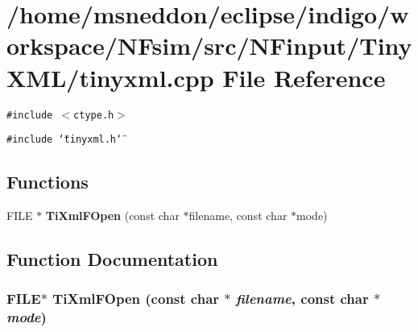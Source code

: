 \section{/home/msneddon/eclipse/indigo/workspace/NFsim/src/NFinput/TinyXML/tinyxml.cpp File Reference}
\label{tinyxml_8cpp}


{\tt \#include $<$ctype.h$>$}\par
{\tt \#include \char`\"{}tinyxml.h\char`\"{}}\par
\subsection*{Functions}
\begin{CompactItemize}
\item 
FILE $\ast$ {\bf TiXmlFOpen} (const char $\ast$filename, const char $\ast$mode)
\end{CompactItemize}


\subsection{Function Documentation}
\subsubsection{\setlength{\rightskip}{0pt plus 5cm}FILE$\ast$ TiXmlFOpen (const char $\ast$ {\em filename}, const char $\ast$ {\em mode})}\label{tinyxml_8cpp_72fac93bfb73cb50c2bfb3f9c8520557}


